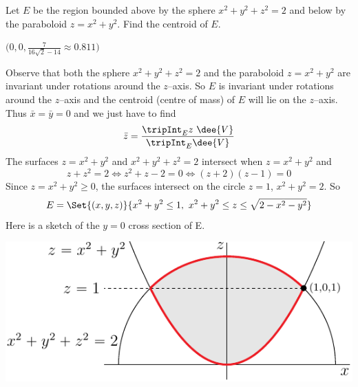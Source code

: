 \begin{question}[M200 2010D] %
Let $E$ be the region bounded above by the sphere $x^2 + y^2 + z^2 = 2$ and below by the
paraboloid $z = x^2 + y^2$. Find the centroid of $E$.
\end{question}

%

\begin{answer}
$\big(0,0,\frac{7}{16\sqrt{2}-14}
  \approx 0.811\big)$
\end{answer}

\begin{solution}
Observe that both the sphere $x^2+y^2+z^2=2$
and the paraboloid $z=x^2+y^2$  are invariant under rotations
around the $z$--axis. So $E$ is invariant under rotations around the
$z$--axis and the centroid (centre of mass) of $E$ will lie on the
$z$--axis. Thus $\bar x=\bar y=0$ and we just have to find
\begin{align*}
\bar z = \frac{\tripInt_E z\ \dee{V}}{\tripInt_E\dee{V}}
\end{align*} 
The surfaces $z = x^2 + y^2$ and $x^2 + y^2 + z^2 = 2$
intersect when $z=x^2+y^2$ and
\begin{equation*}
z+z^2=2
\iff z^2+z-2=0
\iff(z+2)(z-1)=0
\end{equation*}
Since $z=x^2+y^2\ge 0$, the surfaces intersect on the circle $z=1$,
$x^2+y^2=2$. So 
\begin{equation*}
E = \Set{(x,y,z)}{ x^2+y^2\le 1,\ x^2+y^2\le z\le \sqrt{2-x^2-y^2}}
\end{equation*}
Here is a sketch of the $y=0$ cross section of E.
\begin{center}
     \includegraphics{fig/OE10D_6.pdf}
\end{center}


\end{solution}
